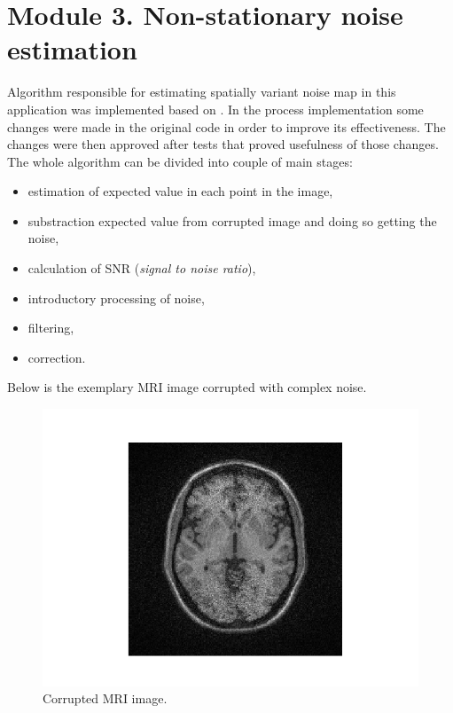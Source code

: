 \section{Module 3. Non-stationary noise estimation}
Algorithm responsible for estimating spatially variant noise map in this application was implemented based on \cite{aja2015spatially}.
In the process implementation some changes were made in the original code in order to improve its effectiveness. The changes were then approved after tests that proved usefulness of those changes. The whole algorithm can be divided into couple of main stages:
\begin{itemize}
	\item estimation of expected value in each point in the image,
	\item substraction expected value from corrupted image and doing so getting the noise,
	\item calculation of SNR (\textit{signal to noise ratio}),
	\item introductory processing of noise,
	\item filtering,
	\item correction.
\end{itemize}
Below is the exemplary MRI image corrupted with complex noise.
\begin{figure}[H]
	\centering{}
		\includegraphics[scale=0.7]{figures/module03/70}
	\caption{Corrupted MRI image.} 
\end{figure}
